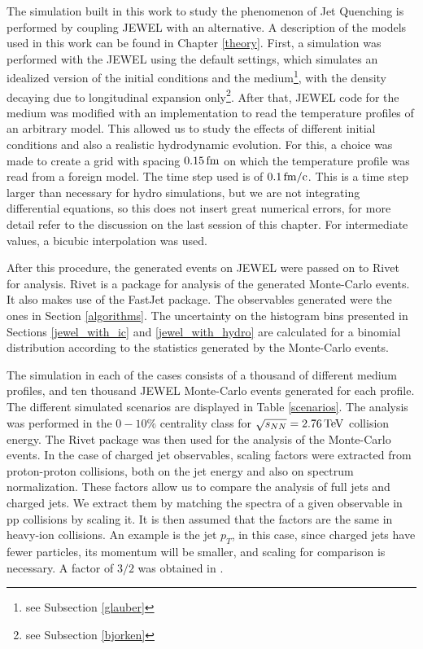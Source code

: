 
The simulation built in this work to study the phenomenon of Jet Quenching is performed by coupling JEWEL with an alternative. A description of the models used in this work can be found in Chapter \ref{theory}. First, a simulation was performed with the JEWEL using the default settings, which simulates an idealized version of the initial conditions and the medium\footnote{see Subsection \ref{glauber}}, with the density decaying due to longitudinal expansion only\footnote{see Subsection \ref{bjorken}}. After that, JEWEL code for the medium was modified with an implementation to read the temperature profiles of an arbitrary model. This allowed us to study the effects of different initial conditions and also a realistic hydrodynamic evolution. For this, a choice was made to create a grid with spacing $0.15 \,\rm fm$ on which the temperature profile was read from a foreign model. The time step used is of $0.1 \,\rm fm/c$. This is a time step larger than necessary for hydro simulations, but we are not integrating differential equations, so this does not insert great numerical errors, for more detail refer to the discussion on the last session of this chapter. For intermediate values, a bicubic interpolation was used.
\par 
After this procedure, the generated events on JEWEL were passed on to Rivet\cite{bierlich_robust_2019} for analysis. Rivet is a package for analysis of the generated Monte-Carlo events. It also makes use of the FastJet\cite{cacciari_fastjet_2012} package. The observables generated were the ones in Section \ref{algorithms}. The uncertainty on the histogram bins presented in Sections \ref{jewel_with_ic} and \ref{jewel_with_hydro} are calculated for a binomial distribution according to the statistics generated by the Monte-Carlo events.
\par
The simulation in each of the cases consists of a thousand of different medium profiles, and ten thousand JEWEL Monte-Carlo events generated for each profile. The different simulated scenarios are displayed in Table \ref{scenarios}. The analysis was performed in the $0-10\%$ centrality class for $\sqrt{s_{NN}} = 2.76 \, {\rm TeV}$ collision energy. The Rivet package was then used for the analysis of the Monte-Carlo events. In the case of charged jet observables, scaling factors were extracted from proton-proton collisions, both on the jet energy and also on spectrum normalization\cite{zapp_geometrical_2014}. These factors allow us to compare the analysis of full jets and charged jets. We extract them by matching the spectra of a given observable in pp collisions by scaling it. It is then assumed that the factors are the same in heavy-ion collisions. An example is the jet $p_T$, in this case, since charged jets have fewer particles, its momentum will be smaller, and scaling for comparison is necessary. A factor of $3/2$ was obtained in \cite{zapp_geometrical_2014}.

